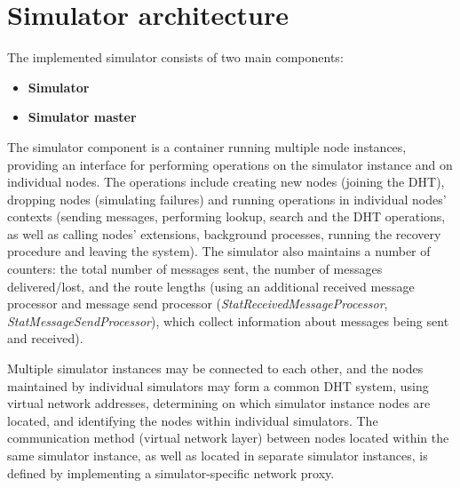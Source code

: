 
\chapter{Simulator architecture}
\label{sec:simulator}

The implemented simulator consists of two main components:

\begin{itemize}
	\renewcommand{\labelitemi}{$\bullet$}
	
	\item \textbf{Simulator}
	\item \textbf{Simulator master}
	
\end{itemize}

The simulator component is a container running multiple node instances, providing an interface for performing operations on the simulator instance and on individual nodes. The operations include creating new nodes (joining the DHT), dropping nodes (simulating failures) and running operations in individual nodes' contexts (sending messages, performing lookup, search and the DHT operations, as well as calling nodes' extensions, background processes, running the recovery procedure and leaving the system). The simulator also maintains a number of counters: the total number of messages sent, the number of messages delivered/lost, and the route lengths (using an additional received message processor and message send processor (\emph{StatReceivedMessageProcessor}, \emph{StatMessageSendProcessor}), which collect information about messages being sent and received).

Multiple simulator instances may be connected to each other, and the nodes maintained by individual simulators may form a common DHT system, using virtual network addresses, determining on which simulator instance nodes are located, and identifying the nodes within individual simulators. The communication method (virtual network layer) between nodes located within the same simulator instance, as well as located in separate simulator instances, is defined by implementing a simulator-specific network proxy.

